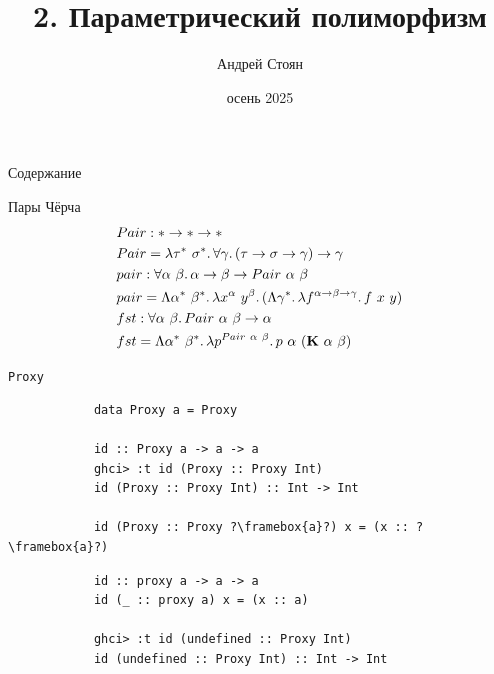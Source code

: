 
\newif\ifhandout




\title[2. Параметрический полиморфизм]{2. Параметрический полиморфизм}
\author{Андрей Стоян}

\date{осень 2025}



    \mymaketitle

    \begin{frame}[noframenumbering]{Содержание}
        \tableofcontents
    \end{frame}


    \begin{frame}[fragile]{Пары Чёрча}
        \pause
        \begin{align*}
            &Pair : * \rightarrow * \rightarrow * \\
            &Pair = \lambda \tau^*~\sigma^*\ldotp\forall \gamma\ldotp(\tau\rightarrow\sigma\rightarrow\gamma)\to\gamma \\
            &pair : \forall \alpha~\beta\ldotp\alpha \rightarrow \beta \rightarrow Pair~\alpha~\beta \\
            &pair = \Lambda \alpha^*~\beta^*\ldotp\lambda x^\alpha~y^\beta\ldotp(\Lambda \gamma^*\ldotp\lambda f^{\alpha\rightarrow\beta\rightarrow\gamma}\ldotp f~x~y) \\
            &fst : \forall \alpha~\beta\ldotp Pair~\alpha~\beta\rightarrow \alpha \\
            &fst = \Lambda \alpha^*~\beta^*\ldotp\lambda p^{Pair~\alpha~\beta}\ldotp p~\alpha~(\mathbf{K}~\alpha~\beta)
        \end{align*}
    \end{frame}

    \begin{frame}[fragile]{\texttt{Proxy}}
        \pause
        \begin{verbatim}
            data Proxy a = Proxy

            id :: Proxy a -> a -> a
            ghci> :t id (Proxy :: Proxy Int)
            id (Proxy :: Proxy Int) :: Int -> Int

            id (Proxy :: Proxy ?\framebox{a}?) x = (x :: ?\framebox{a}?)
        \end{verbatim}

        \pause\hspace{2em}
        \begin{verbatim}
            id :: proxy a -> a -> a
            id (_ :: proxy a) x = (x :: a)

            ghci> :t id (undefined :: Proxy Int)
            id (undefined :: Proxy Int) :: Int -> Int
        \end{verbatim}
    \end{frame}

